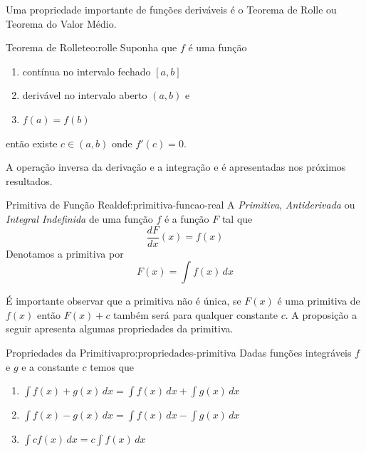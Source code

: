 Uma propriedade importante de funções deriváveis é o Teorema de Rolle ou
Teorema do Valor Médio.

\begin{teorema}{Teorema de Rolle}{teo:rolle}
  Suponha
  que $f$ é uma função
  \begin{enumerate}
    \item contínua  no intervalo fechado $[a, b]$
    \item derivável no intervalo aberto  $(a, b)$ e
    \item \(f(a)=f(b)\)
  \end{enumerate}
  então existe $c\in(a, b)$ onde $f'(c)=0$.
\end{teorema}

A operação inversa da derivação e a integração e é apresentadas nos próximos resultados.

\begin{definicao}{Primitiva de Função Real}{def:primitiva-funcao-real}
  A \emph{Primitiva},
  \emph{Antiderivada} ou
  \emph{Integral Indefinida}
  de uma função $f$ é a função $F$ tal que
  \[
    \frac{dF}{dx}(x) = f(x)
  \]
  Denotamos a primitiva por
  \[
    F(x) = \int f(x)\, dx
  \]
\end{definicao}

É importante observar que a primitiva não é única, se $F(x)$ é uma primitiva de $f(x)$
então $F(x)+c$ também será para qualquer constante $c$. A proposição a seguir
apresenta algumas propriedades da primitiva.

\begin{proposicao}{Propriedades da Primitiva}{pro:propriedades-primitiva}
  Dadas funções integráveis $f$ e $g$ e a constante $c$ temos que
  \begin{enumerate}
    \item \( \int f(x)+g(x)\,dx = \int f(x)\,dx + \int g(x)\,dx\)
    \item \( \int f(x)-g(x)\,dx = \int f(x)\,dx - \int g(x)\,dx\)
    \item \( \int cf(x)\,dx   = c \int f(x)\,dx \)
  \end{enumerate}
\end{proposicao}


